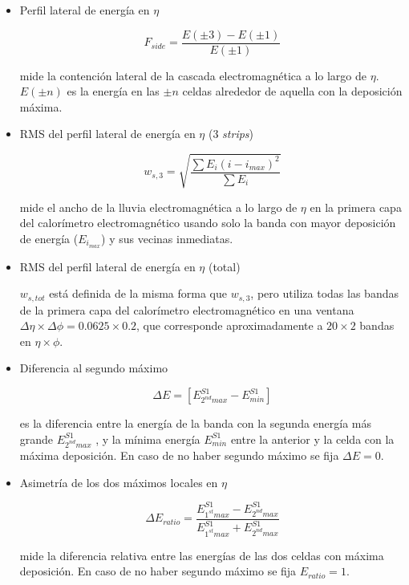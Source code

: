 \begin{itemize}
	\item  Perfil lateral de energía en $\eta$

		\begin{equation}
		F_{side}=\frac{E(\pm 3)-E(\pm 1)}{E(\pm 1)}
		\end{equation}

		mide la contención lateral de la cascada electromagnética a lo largo de $\eta$. $E(\pm n)$ es la energía en las $\pm n$ celdas alrededor de aquella con la deposición máxima.

	\item  RMS del perfil lateral de energía en $\eta$ (3 \textit{strips})

		\begin{equation}
		w_{s,3}=\sqrt{\frac{\sum E_{i}(i-i_{max})^{2}}{\sum E_{i}}}
		\end{equation}

		mide el ancho de la lluvia electromagnética a lo largo de $\eta$ en la primera capa del calorímetro electromagnético usando solo la banda con mayor deposición de energía ($E_{i_{max}}$) y sus vecinas inmediatas.

	\item  RMS del perfil lateral de energía en $\eta$ (total)

		$w_{s,tot}$ está definida de la misma forma que $w_{s,3}$, pero utiliza todas las bandas de la primera capa del calorímetro electromagnético en una ventana $\Delta\eta\times\Delta\phi = 0.0625 \times 0.2$, que corresponde aproximadamente a $20\times 2$ bandas en $\eta \times \phi$.

	\item  Diferencia al segundo máximo

		\begin{equation}
		\Delta E=[E_{2^{nd} max}^{S1} - E_{min}^{S1}]
		\end{equation}

		es la diferencia entre la energía de la banda con la segunda energía más grande $E_{2^{nd} max}^{S1}$ , y la mínima energía $E_{min}^{S1}$ entre la anterior y la celda con la máxima deposición. En caso de no haber segundo máximo se fija $\Delta E = 0$.

	\item  Asimetría de los dos máximos locales en $\eta$

		\begin{equation}
		\Delta E_{ratio}=\frac{E_{1^{st} max}^{S1} - E_{2^{nd} max}^{S1}}{E_{1^{st} max}^{S1} + E_{2^{nd} max}^{S1}}
		\end{equation}
 
 		mide la diferencia relativa entre las energías de las dos celdas con máxima deposición. En caso de no haber segundo máximo se fija $E_{ratio} = 1$.


\end{itemize}

